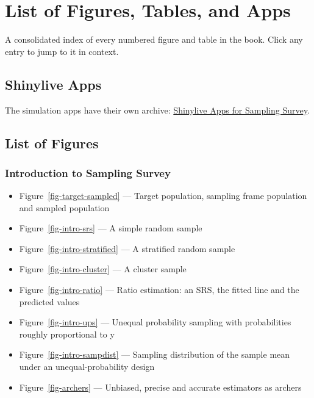 \documentclass[
  letterpaper,
  DIV=11,
  numbers=noendperiod]{scrreprt}
\providecommand{\tightlist}{%
  \setlength{\itemsep}{0pt}\setlength{\parskip}{0pt}}
\renewcommand{\[}{\begin{equation}}
\renewcommand{\]}{\end{equation}}
\begin{document}
\cleardoublepage
{}
{}
\appendix

\chapter{List of Figures, Tables, and
Apps}\label{list-of-figures-tables-and-apps}

A consolidated index of every numbered figure and table in the book.
Click any entry to jump to it in context.

\section{Shinylive Apps}\label{shinylive-apps}

The simulation apps have their own archive:
\href{../shinylives_sampling/index.html}{Shinylive Apps for Sampling
Survey}.

\section{List of Figures}\label{list-of-figures}

\subsection{Introduction to Sampling
Survey}\label{introduction-to-sampling-survey-1}

\begin{itemize}
\tightlist
\item
  Figure~\ref{fig-target-sampled} --- Target population, sampling frame
  population and sampled population
\item
  Figure~\ref{fig-intro-srs} --- A simple random sample
\item
  Figure~\ref{fig-intro-stratified} --- A stratified random sample
\item
  Figure~\ref{fig-intro-cluster} --- A cluster sample
\item
  Figure~\ref{fig-intro-ratio} --- Ratio estimation: an SRS, the fitted
  line and the predicted values
\item
  Figure~\ref{fig-intro-ups} --- Unequal probability sampling with
  probabilities roughly proportional to y
\item
  Figure~\ref{fig-intro-sampdist} --- Sampling distribution of the
  sample mean under an unequal-probability design
\item
  Figure~\ref{fig-archers} --- Unbiased, precise and accurate estimators
  as archers
\end{itemize}
\end{document}

